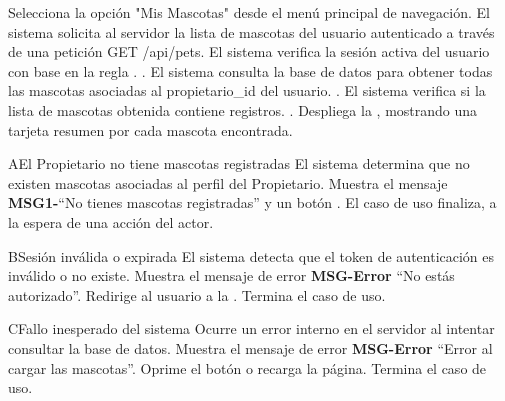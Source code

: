  \begin{UCtrayectoria}
      \UCpaso[\UCactor] Selecciona la opción "Mis Mascotas" desde el menú principal de navegación. \label{CU03-Start}
      \UCpaso El sistema solicita al servidor la lista de mascotas del usuario autenticado a través de una petición GET /api/pets.
      \UCpaso El sistema verifica la sesión activa del usuario con base en la regla . .
      \UCpaso El sistema consulta la base de datos para obtener todas las mascotas asociadas al propietario\_id del usuario. .
      \UCpaso El sistema verifica si la lista de mascotas obtenida contiene registros. .
      \UCpaso Despliega la , mostrando una tarjeta resumen por cada mascota encontrada.
  \end{UCtrayectoria}
  
  
  \begin{UCtrayectoriaA}{A}{El Propietario no tiene mascotas registradas}
      \UCpaso El sistema determina que no existen mascotas asociadas al perfil del Propietario.
      \UCpaso Muestra el mensaje {\bf MSG1-}``No tienes mascotas registradas'' y un botón .
      \UCpaso El caso de uso finaliza, a la espera de una acción del actor.
  \end{UCtrayectoriaA}
  
  \begin{UCtrayectoriaA}{B}{Sesión inválida o expirada}
      \UCpaso El sistema detecta que el token de autenticación es inválido o no existe.
      \UCpaso Muestra el mensaje de error {\bf MSG-Error} ``No estás autorizado''.
      \UCpaso[] Redirige al usuario a la .
      \UCpaso[] Termina el caso de uso.
  \end{UCtrayectoriaA}
  
  \begin{UCtrayectoriaA}{C}{Fallo inesperado del sistema}
      \UCpaso Ocurre un error interno en el servidor al intentar consultar la base de datos.
      \UCpaso Muestra el mensaje de error {\bf MSG-Error} ``Error al cargar las mascotas''.
      \UCpaso[\UCactor] Oprime el botón  o recarga la página.
      \UCpaso[] Termina el caso de uso.
  \end{UCtrayectoriaA}
  
